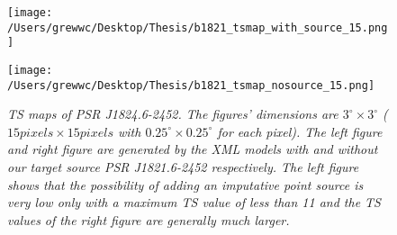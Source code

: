 \documentclass[12pt]{report}
\newcommand{\mycaption}[1]{\caption{\textit{\footnotesize #1}}}
\begin{document}
            \begin{figure}[!ht]
              \begin{center}
              \begin{minipage}{0.46\textwidth}
                \begin{center} 
                  \texttt{[image: /Users/grewwc/Desktop/Thesis/b1821\_tsmap\_with\_source\_15.png]}
                \end{center}
              \end{minipage}
              \begin{minipage}{0.45\textwidth}
                \begin{center}
                  \texttt{[image: /Users/grewwc/Desktop/Thesis/b1821\_tsmap\_nosource\_15.png]}
                \end{center}
              \end{minipage}
            \end{center}

              \centering
              \begin{minipage}{\textwidth}
                \mycaption{TS maps of PSR J1824.6-2452. The figures' dimensions are $3^{\circ} \times3^{\circ}$ ($15 pixels \times 
                15 pixels$ with $0.25^{\circ} \times 0.25^{\circ}$ for each pixel). The \textsf{left}
                figure and \textsf{right} figure are generated by the XML models with and without our 
                target source PSR J1821.6-2452 respectively. The \textsf{left} figure shows that the possibility 
                of adding an imputative point source is very low only with a maximum TS value of 
                less than 11 and the TS values of the \textsf{right} figure are generally much larger.}
                \label{fig: b1821_tsmap_comparison_15}
              \end{minipage}
            \end{figure}
            \vspace{1cm}
\end{document}
